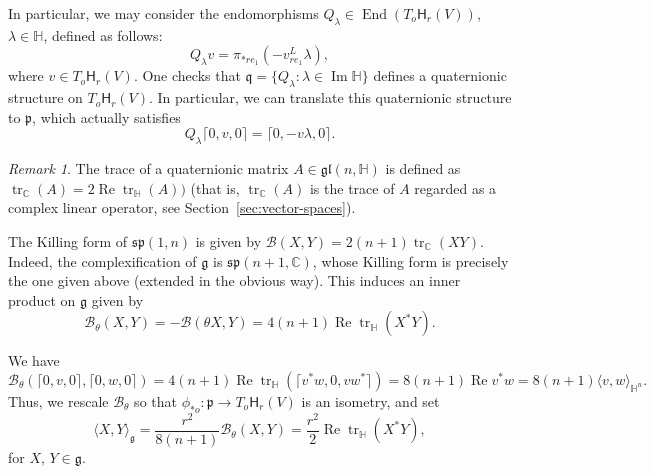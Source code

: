 \documentclass[12pt, a4paper,draft]{amsart}
\newcommand{\g}{\mathfrak}
\newcommand{\tr}{\operatorname{tr}}
\newcommand{\C}{\mathbb{C}}
\renewcommand{\H}{\mathbb{H}}
\renewcommand{\Re}{\operatorname{Re}}
\renewcommand{\Im}{\operatorname{Im}}
\theoremstyle{remark}
\newtheorem{remark}{Remark}
\begin{document}
In particular, we may consider the endomorphisms $Q_{\lambda}\in \operatorname{End}(T_{o}\mathsf{H}_r(V))$, $\lambda\in \H$, defined as follows:
\[
Q_{\lambda}v=\pi_{*re_{1}}\left(-v^{L}_{re_{1}}\lambda\right),
\]
where $v\in T_{o}\mathsf{H}_r(V)$.
One checks that $\g{q}=\{Q_{\lambda}\colon \lambda\in \Im\H\}$ defines a quaternionic structure on $T_{o}\mathsf{H}_r(V)$.
In particular, we can translate this quaternionic structure to $\g{p}$, which actually satisfies
\[
Q_{\lambda}\lceil 0,v,0\rceil=\lceil 0,-v\lambda,0 \rceil.
\]

\begin{remark}
	The trace of a quaternionic matrix $A\in \g{gl}(n,\H)$ is defined as $\tr_{\C}(A)=2 \Re\tr_{\H} (A))$ 
	(that is, $\tr_{\C}(A)$ is the trace of $A$ regarded as a complex linear operator, see Section~\ref{sec:vector-spaces}).
\end{remark}

The Killing form of $\g{sp}(1,n)$ is given by $\mathcal{B}(X,Y)=2(n+1)\tr_{\C}(XY)$.
Indeed, the complexification of $\g{g}$ is $\g{sp}(n+1,\C)$, whose Killing form is precisely the one given above (extended in the obvious way).
This induces an inner product on $\g{g}$ given by 
\[
\mathcal{B}_{\theta}(X,Y)
=-\mathcal{B}(\theta X, Y)
=4(n+1)\Re\tr_{\H}(X^{*}Y).
\]

We have 
\[
\mathcal{B}_\theta(\lceil 0,v,0\rceil,\lceil 0,w,0\rceil)
=4(n+1)\Re\tr_\H(\lceil v^*w,0,vw^*\rceil)
=8(n+1)\Re v^*w
=8(n+1)\langle v,w\rangle_{\H^n}.
\]
Thus, we rescale $\mathcal{B}_\theta$ so that $\phi_{*o}\colon\g{p}\to T_o\mathsf{H}_r(V)$ is an isometry, and set
\[
\langle X,Y\rangle_{\g{g}}
=\frac{r^2}{8(n+1)}\mathcal{B}_\theta(X,Y)
=\frac{r^2}{2}\Re\tr_\H(X^*Y),
\]
for $X$, $Y\in\g{g}$.
\end{document}
